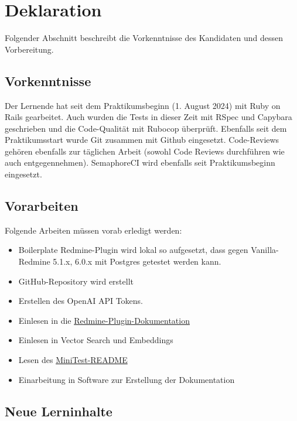\chapter{Deklaration}

Folgender Abschnitt beschreibt die Vorkenntnisse des Kandidaten und dessen Vorbereitung.

\section{Vorkenntnisse}

Der Lernende hat seit dem Praktikumsbeginn (1. August 2024) mit Ruby on Rails gearbeitet. Auch wurden die Tests in dieser Zeit mit RSpec und Capybara geschrieben und die Code-Qualität mit Rubocop überprüft. Ebenfalls seit dem Praktikumsstart wurde Git zusammen mit Github eingesetzt. Code-Reviews gehören ebenfalls zur täglichen Arbeit (sowohl Code Reviews durchführen wie auch entgegennehmen). SemaphoreCI wird ebenfalls seit Praktikumsbeginn eingesetzt.

\section{Vorarbeiten}

Folgende Arbeiten müssen vorab erledigt werden:

\begin{itemize}
  \item[\checkmark] Boilerplate Redmine-Plugin wird lokal so aufgesetzt, dass gegen Vanilla-Redmine 5.1.x, 6.0.x mit Postgres getestet werden kann.
  \item[\checkmark] GitHub-Repository wird erstellt
  \item[\checkmark] Erstellen des OpenAI API Tokens.
  \item[\checkmark] Einlesen in die \href{https://www.redmine.org/boards/4/topics/45309}{Redmine-Plugin-Dokumentation}
  \item[\checkmark] Einlesen in Vector Search und Embeddings
  \item[\checkmark] Lesen des \href{https://github.com/minitest/minitest}{MiniTest-README}
  \item[\checkmark] Einarbeitung in Software zur Erstellung der Dokumentation
\end{itemize}

\section{Neue Lerninhalte}

